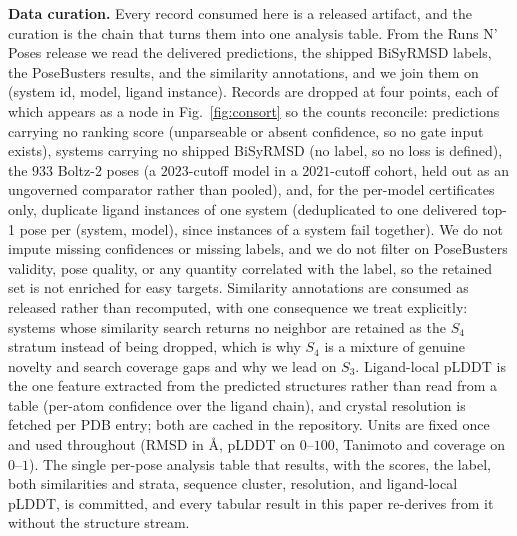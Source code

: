 \documentclass[10pt]{article}
\begin{document}
\textbf{Data curation.} Every record consumed here is a released artifact, and the curation is the chain
that turns them into one analysis table. From the Runs N' Poses release we read the delivered predictions,
the shipped BiSyRMSD labels, the PoseBusters results, and the similarity annotations, and we join them on
(system id, model, ligand instance). Records are dropped at four points, each of which appears as a node in
Fig.~\ref{fig:consort} so the counts reconcile: predictions carrying no ranking score (unparseable or
absent confidence, so no gate input exists), systems carrying no shipped BiSyRMSD (no label, so no loss is
defined), the $933$ Boltz-2 poses (a $2023$-cutoff model in a $2021$-cutoff cohort, held out as an
ungoverned comparator rather than pooled), and, for the per-model certificates only, duplicate ligand
instances of one system (deduplicated to one delivered top-1 pose per (system, model), since instances of a
system fail together). We do not impute missing confidences or missing labels, and we do not filter on
PoseBusters validity, pose quality, or any quantity correlated with the label, so the retained set is not
enriched for easy targets. Similarity annotations are consumed as released rather than recomputed, with one
consequence we treat explicitly: systems whose similarity search returns no neighbor are retained as the
$S_4$ stratum instead of being dropped, which is why $S_4$ is a mixture of genuine novelty and search
coverage gaps and why we lead on $S_3$. Ligand-local pLDDT is the one feature extracted from the predicted
structures rather than read from a table (per-atom confidence over the ligand chain), and crystal
resolution is fetched per PDB entry; both are cached in the repository. Units are fixed once and used
throughout (RMSD in \AA, pLDDT on $0$--$100$, Tanimoto and coverage on $0$--$1$). The single per-pose
analysis table that results, with the scores, the label, both similarities and strata, sequence cluster,
resolution, and ligand-local pLDDT, is committed, and every tabular result in this paper re-derives from it
without the structure stream.
\end{document}
